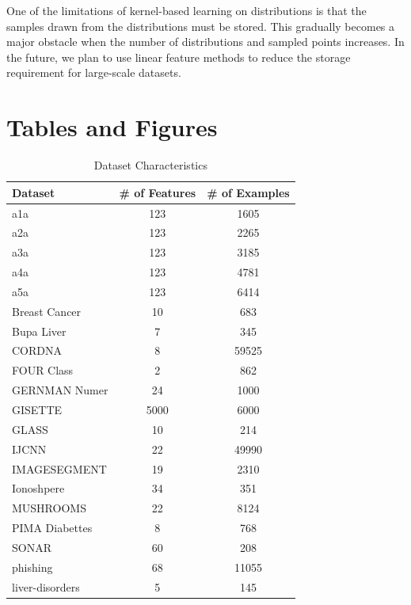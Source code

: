 	One of the limitations of kernel-based learning on distributions is that the samples drawn from the distributions must be stored. This gradually becomes a major obstacle when the number of distributions and sampled points increases. In the future, we plan to use linear feature methods to reduce the storage requirement for large-scale datasets.
	
	\section*{Tables and Figures}
	\begin{table}[h!]
		\centering
		\caption{Dataset Characteristics}
		\label{tab:datasets}
		\begin{tabular}{l|c|c}
			\hline
			Dataset & \# of Features & \# of Examples \\
			\hline
			a1a & 123 & 1605 \\
			a2a & 123 & 2265 \\
			a3a & 123 & 3185 \\
			a4a & 123 & 4781 \\
			a5a & 123 & 6414 \\
			Breast Cancer & 10 & 683 \\
			Bupa Liver & 7 & 345 \\
			CORDNA & 8 & 59525 \\
			FOUR Class & 2 & 862 \\
			GERNMAN Numer & 24 & 1000 \\
			GISETTE & 5000 & 6000 \\
			GLASS & 10 & 214 \\
			IJCNN & 22 & 49990 \\
			IMAGESEGMENT & 19 & 2310 \\
			Ionoshpere & 34 & 351 \\
			MUSHROOMS & 22 & 8124 \\
			PIMA Diabettes & 8 & 768 \\
			SONAR & 60 & 208 \\
			phishing & 68 & 11055 \\
			liver-disorders & 5 & 145 \\
			\hline
		\end{tabular}
	\end{table}
	
